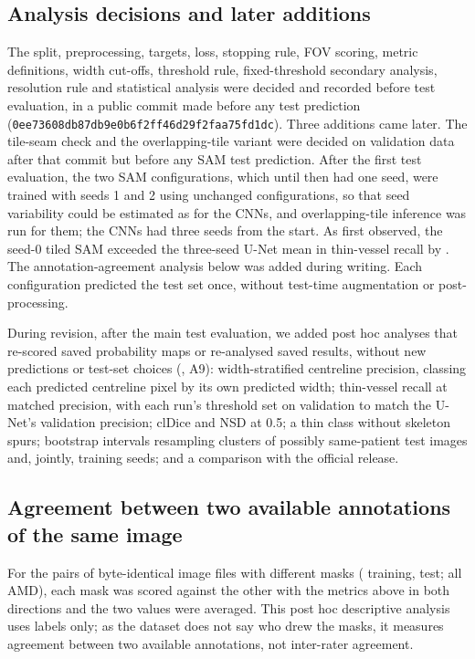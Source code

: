 \subsection*{Analysis decisions and later additions}
The split, preprocessing, targets, loss, stopping rule, FOV scoring, metric definitions, width cut-offs, threshold rule,
fixed-threshold secondary analysis, resolution rule and statistical analysis were decided and recorded before test
evaluation, in a public commit made before any test prediction (\texttt{0ee73608db87db9e0b6f2ff46d29f2faa75fd1dc}). Three
additions came later. The tile-seam check and the overlapping-tile variant were decided on validation data after that
commit but before any SAM test prediction. After the first test evaluation, the two SAM configurations, which until then had
one seed, were trained with seeds 1 and 2 using unchanged configurations, so that seed variability could be estimated as for
the CNNs, and overlapping-tile inference was run for them; the CNNs had three seeds from the start. As first observed, the
seed-0 tiled SAM exceeded the three-seed U-Net mean in thin-vessel recall by \SAMTiledSeedAThinMinusUNet. The
annotation-agreement analysis below was added during writing. Each configuration predicted the test set once, without
test-time augmentation or post-processing.

During revision, after the main test evaluation, we added post hoc analyses that re-scored saved probability maps or
re-analysed saved results, without new predictions or test-set choices (, A9): width-stratified
centreline precision, classing each predicted centreline pixel by its own predicted width; thin-vessel recall at matched
precision, with each run's threshold set on validation to match the U-Net's validation precision; clDice and NSD at 0.5;
a thin class without skeleton spurs; bootstrap intervals resampling clusters of possibly same-patient test images and,
jointly, training seeds; and a comparison with the official release.

\subsection*{Agreement between two available annotations of the same image}
For the \AgreeNPairs{} pairs of byte-identical image files with different masks (\AgreeNTrain{} training, \AgreeNTest{}
test; all AMD), each mask was scored against the other with the metrics above in both directions and the two values were
averaged. This post hoc descriptive analysis uses labels only; as the dataset does not say who drew the masks, it measures
agreement between two available annotations, not inter-rater agreement.

